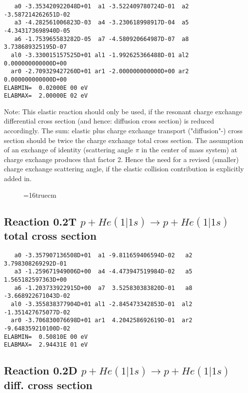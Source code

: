 \documentclass[12pt]{article}
\begin{document}
\begin{small}\begin{verbatim}
   a0 -3.353420922048D+01  a1 -3.522409780724D-01  a2 -3.587214262651D-02
   a3 -4.282561006823D-03  a4 -3.230618998917D-04  a5 -4.343173698940D-05
   a6 -1.753965583282D-05  a7 -4.580920664987D-07  a8  3.738689325195D-07
  al0 -3.330015157525D+01 al1 -1.992625366488D-01 al2  0.000000000000D+00
  ar0 -2.709329427260D+01 ar1 -2.000000000000D+00 ar2  0.000000000000D+00
ELABMIN=  0.02000E 00 eV
ELABMAX=  2.00000E 02 eV
\end{verbatim}\end{small}
Note: This elastic reaction should only be used, if the resonant charge
exchange differential cross section (and hence: diffusion cross section)
is reduced accordingly. The sum: elastic plus charge exchange transport
("diffusion"-) cross section should be twice the charge exchange total
cross section. The assumption of an exchange of identity (scattering
angle $\pi$ in the center of mass system) at charge exchange produces
that factor 2. Hence the need for a revised (smaller) charge exchange
scattering angle, if the elastic collision contribution is explicitly
added in.

\begin{figure} \label{0.1}
\epsfxsize=16truecm
\end{figure}
\newpage

\subsection{
Reaction 0.2T   $ p + He(1|1s) \rightarrow p + He (1|1s)$ total cross section
}



\begin{small}\begin{verbatim}
   a0 -3.357907136508D+01  a1 -9.811659406594D-02   a2  3.798308269292D-01
   a3 -1.259671949006D+00  a4 -4.473947519984D-02   a5  1.565182597363D+00
   a6 -1.203733922915D+00  a7  3.525830383820D-01   a8 -3.668922671043D-02
  al0 -3.355838377904D+01 al1 -2.845473342853D-01  al2 -1.351427675077D-02
  ar0 -3.706830076698D+01 ar1  4.204258692619D-01  ar2 -9.648359210100D-02
ELABMIN=  0.50810E 00 eV
ELABMAX=  2.94431E 01 eV
\end{verbatim}\end{small}

\subsection{
Reaction 0.2D    $p + He(1|1s) \rightarrow p + He (1|1s) $ diff. cross
section }
\end{document}
